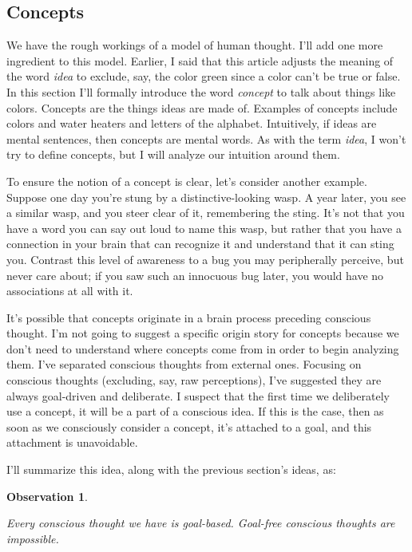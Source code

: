\documentclass[11pt, oneside]{article}
\newtheorem{obs}{Observation}
\theoremstyle{argtstyle}
\begin{document}
\subsection{Concepts}\label{s_mental_words}

We have the rough workings of a model of human thought.
I'll add one more
ingredient to this model.
Earlier, I said that this article adjusts the meaning of the word
{\em idea} to exclude, say, the color green since a color
can't be true or false.
In this section I'll formally introduce the word {\em concept} to talk about
things like colors.
Concepts are
the things ideas are made of.
Examples of concepts include
colors and water heaters and letters of the alphabet.
Intuitively, if
ideas are mental sentences, then
concepts are mental words.
As with the term {\em idea}, I won't try to define concepts,
but I will analyze our intuition around them.

To ensure the notion of a concept is clear, let's consider another example.
Suppose one day you're stung
by a distinctive-looking wasp.
A year later, you see a similar wasp, and you
steer clear of it, remembering the sting.
It's not that you have a word you can say out loud to name this wasp,
but rather that you have a connection in your brain that can recognize it and
understand that it can sting you.
Contrast this level of awareness to a bug you may peripherally perceive, but
never care about; if you saw such an innocuous bug later, you would have no
associations at all with it.

It's possible that concepts originate in a brain process preceding conscious
thought.
I'm not going to suggest a specific origin story for concepts
because we don't need to understand where concepts come from
in order to begin analyzing them.
I've separated conscious thoughts from external ones.
Focusing on conscious thoughts (excluding, say, raw perceptions),
I've suggested they are always goal-driven and deliberate.
I suspect that
the first time we deliberately use a concept, it will be a
part of a conscious idea.
If this is the case, then
as soon as we consciously consider a concept, it's attached
to a goal, and this attachment is unavoidable.


I'll summarize this idea, along with the previous section's ideas, as:
\newcommand{\obsfour}{
    Every conscious thought we have is goal-based.
    Goal-free conscious %
    thoughts are impossible.
}
\begin{obs}\label{o4}
    \obsfour
\end{obs}
\end{document}
